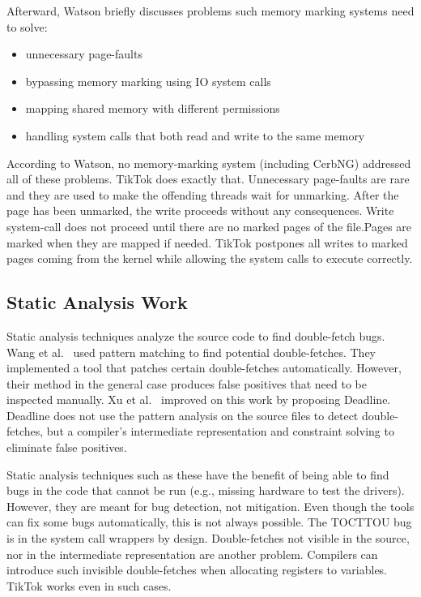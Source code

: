 \documentclass[conference]{IEEEtran}
\newcommand{\sysname}{TikTok}
\begin{document}
Afterward, Watson briefly discusses problems such memory marking systems
need to solve: 
\begin{itemize}
    \item unnecessary page-faults
    \item bypassing memory marking using IO system calls
    \item mapping shared memory with different permissions
    \item handling system calls that both read and write to the same memory
\end{itemize}

According to Watson, no memory-marking system (including CerbNG) addressed all
of these problems. \sysname{} does exactly that. Unnecessary page-faults are
rare and they are used to make the offending threads wait for unmarking. After
the page has been unmarked, the write proceeds without any consequences. Write
system-call does not proceed until there are no marked pages of the file.Pages
are marked when they are mapped if needed. \sysname{} postpones all writes to
marked pages coming from the kernel while allowing the system calls to execute
correctly.

\subsection{Static Analysis Work}
\label{subsec:dfstatic}
Static analysis techniques analyze the source code to find double-fetch bugs.
Wang et al.~\cite{wang2017double} used pattern matching to find potential
double-fetches. They implemented a tool that patches certain double-fetches
automatically. However, their method in the general case produces false
positives that need to be inspected manually. Xu et al.~\cite{xu2018precise}
improved on this work by proposing Deadline. Deadline does not use the pattern 
analysis on the source files to detect double-fetches, but a compiler's
intermediate representation and constraint solving to eliminate false positives.

Static analysis techniques such as these have the benefit of being able to find
bugs in the code that cannot be run (e.g., missing hardware to test the
drivers). However, they are meant for bug detection, not mitigation. Even though
the tools can fix some bugs automatically, this is not always possible. The
TOCTTOU bug is in the system call wrappers by design. Double-fetches not visible
in the source, nor in the intermediate representation are another problem.
Compilers can introduce such invisible double-fetches when allocating registers
to variables. \sysname{} works even in such cases.
\end{document}
